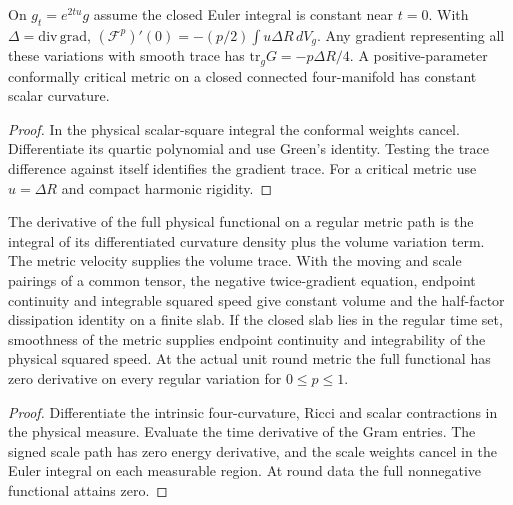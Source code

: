 \begin{proposition}
\label{prop:ed48-trace}
\leanok
On $g_t=e^{2tu}g$ assume the closed Euler integral is constant near $t=0$.
With $\Delta=\mathrm{div}\,\mathrm{grad}$,
$(\mathcal F^p)'(0)=-(p/2)\int u\Delta R\,dV_g$. Any gradient
representing all these variations with smooth trace has
$\mathrm{tr}_g G=-p\Delta R/4$. A positive-parameter conformally critical
metric on a closed connected four-manifold has constant scalar curvature.
\end{proposition}
\begin{proof}
\leanok
In the physical scalar-square integral the conformal weights cancel.
Differentiate its quartic polynomial and use Green's identity.
Testing the trace difference against itself identifies the gradient trace.
For a critical metric use $u=\Delta R$ and compact harmonic rigidity.
\end{proof}

\begin{proposition}
\label{prop:ed48-slab}
\leanok
The derivative of the full physical functional on a regular metric path
is the integral of its differentiated curvature density plus the volume
variation term. The metric velocity supplies the volume trace. With the
moving and scale pairings of a common tensor, the negative twice-gradient
equation, endpoint continuity and integrable squared speed give constant
volume and the half-factor dissipation identity on a finite slab.
If the closed slab lies in the regular time set, smoothness of the metric
supplies endpoint continuity and integrability of the physical squared speed.
At the actual unit round metric the full functional has zero derivative
on every regular variation for $0\le p\le1$.
\end{proposition}
\begin{proof}
\leanok
Differentiate the intrinsic four-curvature, Ricci and scalar contractions
in the physical measure. Evaluate the time derivative of the Gram entries.
The signed scale path has zero energy derivative, and the scale weights
cancel in the Euler integral on each measurable region. At round data the
full nonnegative functional attains zero.
\end{proof}

